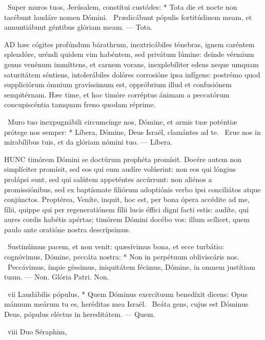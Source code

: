 \R\ Super muros tuos, Jerúsalem, constítui custódes: * Tota die et nocte non tacébunt laudáre nomen Dómini. \V\ Prædicábunt pópulis fortitúdinem meam, et annuntiábunt géntibus glóriam meam. — Tota.


\lettrine[lines=2]{A}{D} hæc cógites profúndum bárathrum, inextricábiles ténebras, ignem caréntem splendóre, uréndi quidem vim habéntem, sed privátum lúmine: deínde vérmium genus venénum immíttens, et carnem vorans, inexplebíliter edens neque umquam saturitátem séntiens, intolerábiles dolóres corrosióne ipsa infígens: postrémo quod suppliciórum ómnium gravíssimum est, oppróbrium illud et confusiónem sempitérnam. Hæc time, et hoc timóre corréptus ánimam a peccatórum concupiscéntia tamquam freno quodam réprime.

\R\ Muro tuo inexpugnábili circumcínge nos, Dómine, et armis tuæ poténtiæ prótege nos semper: * Líbera, Dómine, Deus Israël, clamántes ad te. \V\ Erue nos in mirabílibus tuis, et da glóriam nómini tuo. — Líbera.


\lettrine[lines=2]{H}{UNC} timórem Dómini se doctúrum prophéta promísit. Docére autem non simplíciter promísit, sed eos qui eum audíre volúerint: non eos qui lóngius prolápsi sunt, sed qui salútem appeténtes accúrrunt: non aliénos a promissiónibus, sed ex baptísmate filiórum adoptiónis verbo ipsi conciliátos atque conjúnctos. Proptérea, Veníte, inquit, hoc est, per bona ópera accédite ad me, fílii, quippe qui per regeneratiónem fílii lucis éffici digni facti estis: audíte, qui aures cordis habétis apértas; timórem Dómini docébo vos: illum scílicet, quem paulo ante oratióne nostra descrípsimus.

\R\ Sustinúimus pacem, et non venit: quæsívimus bona, et ecce turbátio: cognóvimus, Dómine, peccáta nostra: * Non in perpétuum obliviscáris nos. \V\ Peccávimus, ímpie géssimus, iniquitátem fécimus, Dómine, in omnem justítiam tuam. — Non. Glória Patri. Non.

\R\ vii Laudábilis pópulus, * Quem Dóminus exercítuum benedíxit dicens: Opus mánuum meárum tu es, heréditas mea Israël. \V\ Beáta gens, cujus est Dóminus Deus, pópulus eléctus in hereditátem. — Quem.

\R\ viii Duo Séraphim, 



